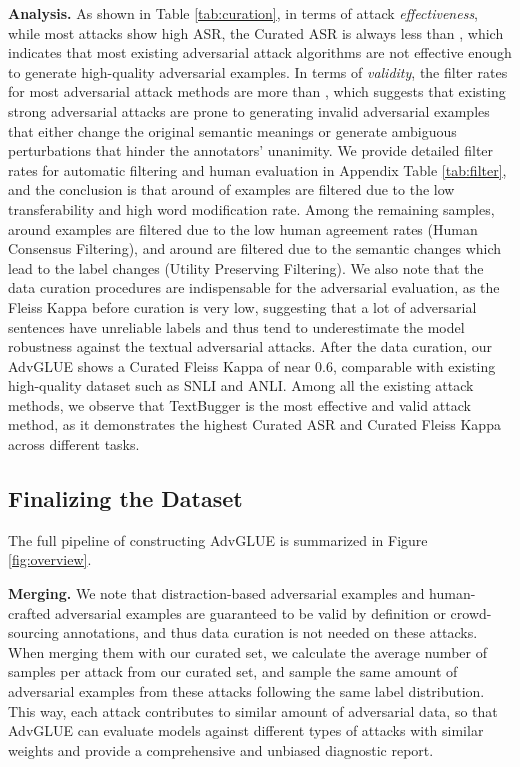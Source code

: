 \documentclass{article}
\newcommand{\method}{AdvGLUE\xspace}
\begin{document}
\textbf{Analysis.} As shown in Table \ref{tab:curation}, in terms of attack \textit{effectiveness}, while most attacks show high ASR, the Curated ASR is always less than , which indicates that most existing adversarial attack algorithms are not effective enough to generate high-quality adversarial examples. 
In terms of \textit{validity}, the filter rates for most adversarial attack methods are more than , which suggests that existing strong adversarial attacks are prone to generating invalid adversarial examples that either change the original semantic meanings or generate ambiguous perturbations that hinder the annotators' unanimity. We provide detailed filter rates for automatic filtering and human evaluation in Appendix Table \ref{tab:filter}, and the conclusion is that around  of examples are filtered due to the low transferability and high word modification rate. Among the remaining samples, around  examples are filtered due to the low human agreement rates (Human Consensus Filtering), and around  are filtered due to the semantic changes which lead to the label changes (Utility Preserving Filtering). We also note that the data curation procedures are indispensable for the adversarial evaluation, as the Fleiss Kappa before curation is very low, suggesting that a lot of adversarial sentences have unreliable labels and thus tend to underestimate the model robustness against the textual adversarial attacks. After the data curation, our \method shows a Curated Fleiss Kappa of near 0.6,
comparable with existing high-quality dataset such as SNLI and ANLI.  
Among all the existing attack methods, we observe that TextBugger is the most effective and valid attack method, as it demonstrates the highest Curated ASR and Curated Fleiss Kappa across different  tasks.

\subsection{Finalizing the Dataset}
The full pipeline of constructing  \method is summarized in Figure \ref{fig:overview}. 


\textbf{Merging.}  We note that distraction-based adversarial examples and human-crafted adversarial examples are guaranteed to be valid by definition or crowd-sourcing annotations, and thus data curation is not needed on these attacks. When merging them with our curated set, 
we calculate the average number of samples per attack from our curated set, and sample the same amount of adversarial examples from these attacks following the same label distribution. This way, each  attack contributes to similar amount of adversarial data, so that \method can evaluate models against different types of  attacks with similar weights and provide a comprehensive and unbiased diagnostic report.
\end{document}
